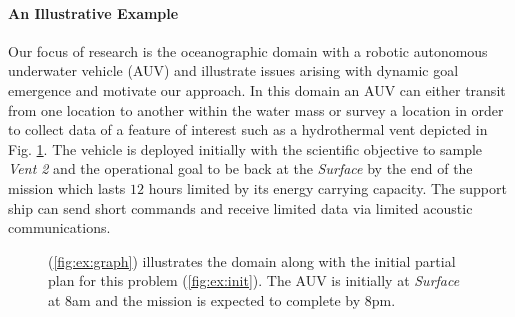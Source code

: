 \paragraph{An Illustrative Example} 
Our focus of research is the oceanographic domain with a robotic
autonomous underwater vehicle (AUV) and illustrate issues arising with
dynamic goal emergence and motivate our approach.  In this domain an AUV
can either transit from one location to another within the water mass
or survey a location in order to collect data of a feature of interest
such as a hydrothermal vent depicted in Fig. \ref{fig:Example}.  The
vehicle is deployed initially with the scientific objective to sample
{\em Vent 2} and the operational goal to be back at the {\em Surface}
by the end of the mission which lasts $12$ hours limited by its energy
carrying capacity. The support ship can send short commands and
receive limited data via limited acoustic communications.

\begin{figure}[!t]
  \centering
  \hfill {}
  \caption{\small{(\ref{fig:ex:graph}) illustrates the domain along
      with the initial partial plan for this problem
      (\ref{fig:ex:init}). The AUV is initially at {\em Surface} at
      $8$am and the mission is expected to complete by $8$pm.}}
\label{fig:Example}
\end{figure}

